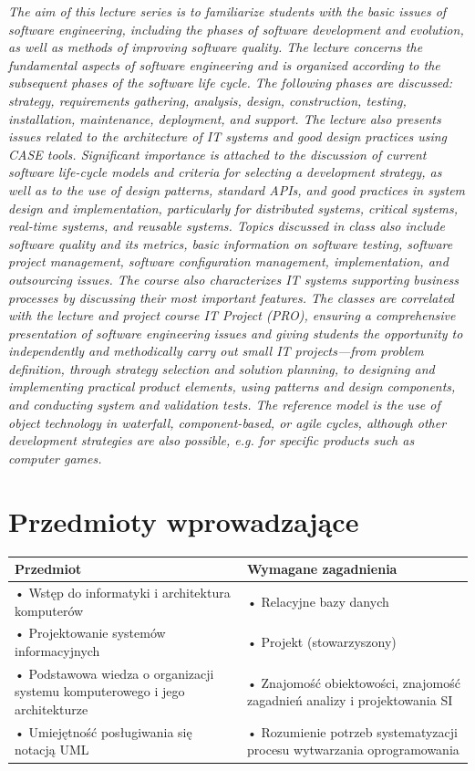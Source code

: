 \documentclass[12pt, a4paper]{article}
\newcommand{\thdrule}{\noalign{\global\setlength{\extrarowheight}{0pt}}}
\newcommand{\thdend}{\noalign{\global\setlength{\extrarowheight}{3pt}}}
\begin{document}
\textit{The aim of this lecture series is to familiarize students with the basic issues of software engineering, including the phases of software development and evolution, as well as methods of improving software quality. The lecture concerns the fundamental aspects of software engineering and is organized according to the subsequent phases of the software life cycle. The following phases are discussed: strategy, requirements gathering, analysis, design, construction, testing, installation, maintenance, deployment, and support. The lecture also presents issues related to the architecture of IT systems and good design practices using CASE tools. Significant importance is attached to the discussion of current software life-cycle models and criteria for selecting a development strategy, as well as to the use of design patterns, standard APIs, and good practices in system design and implementation, particularly for distributed systems, critical systems, real-time systems, and reusable systems. Topics discussed in class also include software quality and its metrics, basic information on software testing, software project management, software configuration management, implementation, and outsourcing issues. The course also characterizes IT systems supporting business processes by discussing their most important features. The classes are correlated with the lecture and project course IT Project (PRO), ensuring a comprehensive presentation of software engineering issues and giving students the opportunity to independently and methodically carry out small IT projects—from problem definition, through strategy selection and solution planning, to designing and implementing practical product elements, using patterns and design components, and conducting system and validation tests. The reference model is the use of object technology in waterfall, component-based, or agile cycles, although other development strategies are also possible, e.g. for specific products such as computer games.}


\section{Przedmioty wprowadzające}

{\scriptsize
\begin{tabularx}{\textwidth}{m{5cm}Y}
\thdrule\toprule
{} {\color{white}\textbf{Przedmiot}} & {\color{white}\textbf{Wymagane zagadnienia}} \\
\midrule\thdend
   • Wstęp do informatyki i architektura komputerów & • Relacyjne bazy danych \\
   • Projektowanie systemów informacyjnych & • Projekt (stowarzyszony) \\
   • Podstawowa wiedza o organizacji systemu komputerowego i jego architekturze & • Znajomość obiektowości, znajomość zagadnień analizy i projektowania SI \\
   • Umiejętność posługiwania się notacją UML & • Rozumienie potrzeb systematyzacji procesu wytwarzania oprogramowania \\
\bottomrule
\end{tabularx}}
\end{document}
